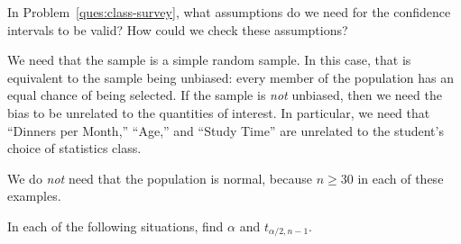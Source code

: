 \documentclass[answers,11pt]{exam}
\begin{document}
\begin{questions}


\question In Problem~\ref{ques:class-survey}, what assumptions do we need for
the confidence intervals to be valid?  How could we check these assumptions?

\begin{solution}
We need that the sample is a simple random sample.  In this case, that is
equivalent to the sample being unbiased: every member of the population has an
equal chance of being selected.  If the sample is \emph{not} unbiased, then we
need the bias to be unrelated to the quantities of interest.  In particular,
we need that ``Dinners per Month,'' ``Age,'' and ``Study Time'' are
unrelated to the student's choice of statistics class.

We do \emph{not} need that the population is normal, because $n \geq 30$ in
each of these examples.
\end{solution}

\newpage


\question \label{ques:t-alpha} In each of the following situations, find
$\alpha$ and $t_{\alpha/2,n-1}$.

\end{questions}
\end{document}

